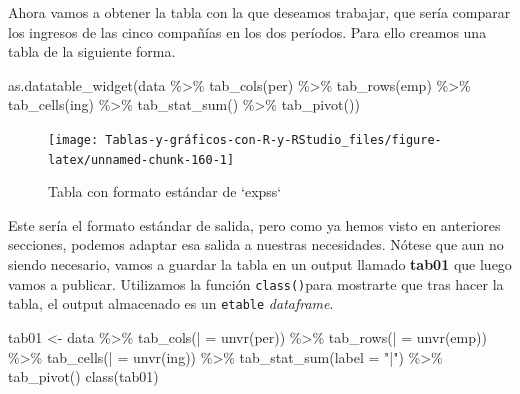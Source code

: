 \documentclass[
]{book}
\newenvironment{Shaded}{\begin{snugshade}}{\end{snugshade}}
\newcommand{\AttributeTok}[1]{\textcolor[rgb]{0.77,0.63,0.00}{#1}}
\newcommand{\FunctionTok}[1]{\textcolor[rgb]{0.00,0.00,0.00}{#1}}
\newcommand{\NormalTok}[1]{#1}
\newcommand{\OtherTok}[1]{\textcolor[rgb]{0.56,0.35,0.01}{#1}}
\newcommand{\SpecialCharTok}[1]{\textcolor[rgb]{0.00,0.00,0.00}{#1}}
\newcommand{\StringTok}[1]{\textcolor[rgb]{0.31,0.60,0.02}{#1}}
\begin{document}
Ahora vamos a obtener la tabla con la que deseamos trabajar, que sería comparar los ingresos de las cinco compañías en los dos períodos. Para ello creamos una tabla de la siguiente forma.

\begin{Shaded}
\begin{Highlighting}[]
\FunctionTok{as.datatable\_widget}\NormalTok{(data }\SpecialCharTok{\%\textgreater{}\%} \FunctionTok{tab\_cols}\NormalTok{(per) }\SpecialCharTok{\%\textgreater{}\%} \FunctionTok{tab\_rows}\NormalTok{(emp) }\SpecialCharTok{\%\textgreater{}\%} 
  \FunctionTok{tab\_cells}\NormalTok{(ing) }\SpecialCharTok{\%\textgreater{}\%} \FunctionTok{tab\_stat\_sum}\NormalTok{() }\SpecialCharTok{\%\textgreater{}\%} \FunctionTok{tab\_pivot}\NormalTok{())}
\end{Highlighting}
\end{Shaded}

\begin{figure}[H]

{\centering \texttt{[image: Tablas-y-gráficos-con-R-y-RStudio\_files/figure-latex/unnamed-chunk-160-1]} 

}

\caption{Tabla con formato estándar de `expss`}\label{fig:unnamed-chunk-160}
\end{figure}

Este sería el formato estándar de salida, pero como ya hemos visto en anteriores secciones, podemos adaptar esa salida a nuestras necesidades. Nótese que aun no siendo necesario, vamos a guardar la tabla en un output llamado \textbf{tab01} que luego vamos a publicar. Utilizamos la función \texttt{class()}para mostrarte que tras hacer la tabla, el output almacenado es un \texttt{etable} \emph{dataframe}.

\begin{Shaded}
\begin{Highlighting}[]
\NormalTok{tab01 }\OtherTok{\textless{}{-}}\NormalTok{ data }\SpecialCharTok{\%\textgreater{}\%} \FunctionTok{tab\_cols}\NormalTok{(}\StringTok{\textasciigrave{}}\AttributeTok{|}\StringTok{\textasciigrave{}} \OtherTok{=} \FunctionTok{unvr}\NormalTok{(per)) }\SpecialCharTok{\%\textgreater{}\%} \FunctionTok{tab\_rows}\NormalTok{(}\StringTok{\textasciigrave{}}\AttributeTok{|}\StringTok{\textasciigrave{}} \OtherTok{=} \FunctionTok{unvr}\NormalTok{(emp)) }\SpecialCharTok{\%\textgreater{}\%} 
  \FunctionTok{tab\_cells}\NormalTok{(}\StringTok{\textasciigrave{}}\AttributeTok{|}\StringTok{\textasciigrave{}} \OtherTok{=} \FunctionTok{unvr}\NormalTok{(ing)) }\SpecialCharTok{\%\textgreater{}\%} \FunctionTok{tab\_stat\_sum}\NormalTok{(}\AttributeTok{label =} \StringTok{"|"}\NormalTok{) }\SpecialCharTok{\%\textgreater{}\%} 
  \FunctionTok{tab\_pivot}\NormalTok{()}
\FunctionTok{class}\NormalTok{(tab01)}
\end{Highlighting}
\end{Shaded}
\end{document}
